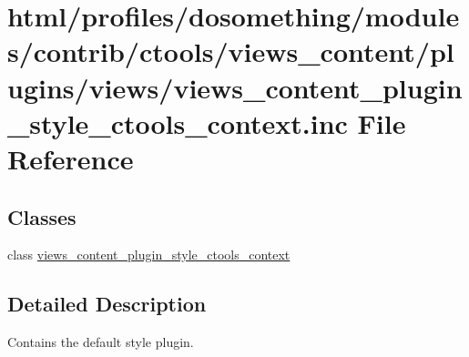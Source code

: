 \hypertarget{views__content__plugin__style__ctools__context_8inc}{
\section{html/profiles/dosomething/modules/contrib/ctools/views\_\-content/plugins/views/views\_\-content\_\-plugin\_\-style\_\-ctools\_\-context.inc File Reference}
\label{views__content__plugin__style__ctools__context_8inc}
}
\subsection*{Classes}
\begin{DoxyCompactItemize}
\item 
class \hyperlink{classviews__content__plugin__style__ctools__context}{views\_\-content\_\-plugin\_\-style\_\-ctools\_\-context}
\end{DoxyCompactItemize}


\subsection{Detailed Description}
Contains the default style plugin. 